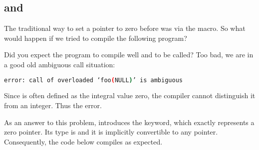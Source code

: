\subsection{ and }

\problemtitle

The traditional way to set a pointer to zero before  was via the
 macro. So what would happen if we tried to compile the
following program?



Did you expect the program to compile well and  to be
called? Too bad, we are in a good old ambiguous call situation:

\begin{lstlisting}[language=bash]
error: call of overloaded ‘foo(NULL)’ is ambiguous
\end{lstlisting}

Since  is often defined as the integral value zero, the
compiler cannot distinguish it from an integer. Thus the error.

\solutiontitle

%
%
As an answer to this problem,  introduces the 
keyword, which exactly represents a zero pointer. Its type is
 and it is implicitly convertible to any
pointer. Consequently, the code below compiles as expected.


